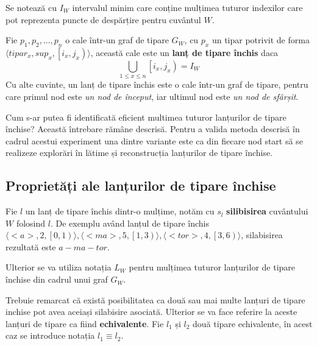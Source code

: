 \begin{defi}
Se notează cu $I_W$ intervalul minim care conține mulțimea tuturor indexilor care pot reprezenta puncte de despărțire pentru cuvântul $W$.
\end{defi}

\begin{defi}
Fie $p_1, p_2, ..., p_n$ o cale într-un graf de tipare $G_W$, cu $p_x$ un tipar potrivit de forma $\langle tipar_x, sup_x, \left[i_x,j_x\right)\rangle$, această cale este un \textbf{lanț de tipare închis} daca 
\begin{equation}
\bigcup_{1 \leq x \leq n} \left[i_x,j_x\right) = I_W
\end{equation}
Cu alte cuvinte, un lanț de tipare închis este o cale într-un graf de tipare, pentru care primul nod este \textit{un nod de început}, iar ultimul nod este \textit{un nod de sfârșit}.
\end{defi}

Cum s-ar putea fi identificată eficient multimea tuturor lanțurilor de tipare închise? Această întrebare rămâne descrisă. Pentru a valida metoda descrisă în cadrul acestui experiment una dintre variante este ca din fiecare nod start să se realizeze explorări în lătime și reconstrucția lanțurilor de tipare închise.

\subsection{Proprietăți ale lanțurilor de tipare închise}

\begin{defi}
Fie $l$ un lanț de tipare închis dintr-o mulțime, notăm cu $s_{l}$ \textbf{silibisirea} cuvântului $W$ folosind $l$. De exemplu având lanțul de tipare închis $\langle <a>, 2, \left[ 0, 1 \right)\rangle, \langle <ma>, 5, \left[ 1, 3 \right)\rangle, \langle <tor>, 4, \left[ 3, 6 \right)\rangle$, silabisirea rezultată este $a-ma-tor$. 
\end{defi}

Ulterior se va utiliza notația $L_W$ pentru mulțimea tuturor lanțurilor de tipare închise din cadrul unui graf $G_W$.

\begin{defi}
Trebuie remarcat că există posibilitatea ca două sau mai multe lanțuri de tipare inchise pot avea aceiași silabisire asociată. Ulterior se va face referire la aceste lanțuri de tipare ca fiind \textbf{echivalente}. Fie $l_1$ și $l_2$ două tipare echivalente, în acest caz se introduce notația $l_1 \equiv l_2$.
\end{defi}

